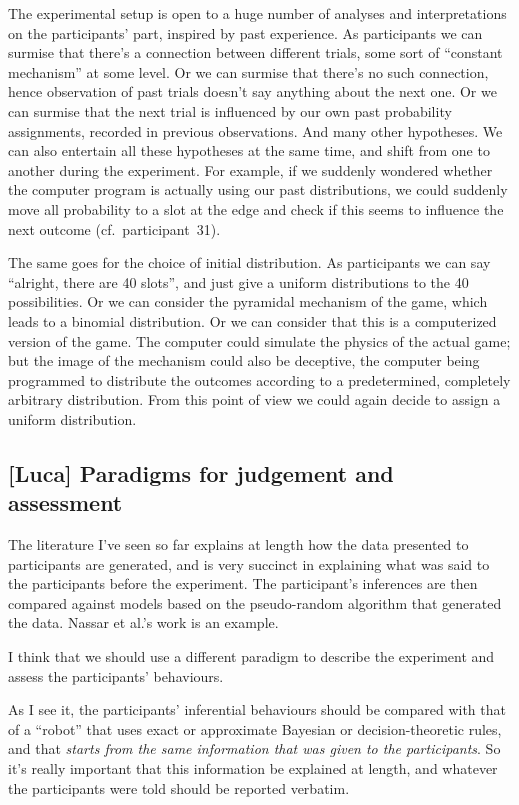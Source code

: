 \documentclass[\ifafour a4paper,12pt,\else a5paper,10pt,\fi%
onecolumn,oneside,article,%
british%
]{memoir}
\newcommand*{\etal}{{et al.}}
\theoremstyle{remark}
\theoremstyle{innote}
\newcommand*{\citey}{\parencites*}
\renewcommand*{\|}{\mathpunct{|}}
\newcommand*{\cf}{{cf.}}
\begin{document}
The experimental setup is open to a huge number of analyses and
interpretations on the participants' part, inspired by past experience. As
participants we can surmise that there's a connection between different
trials, some sort of \enquote{constant mechanism} at some level. Or we can
surmise that there's no such connection, hence observation of past trials
doesn't say anything about the next one. Or we can surmise that the next
trial is influenced by our own past probability assignments, recorded in
previous observations. And many other hypotheses. We can also entertain all
these hypotheses at the same time, and shift from one to another during the
experiment. For example, if we suddenly wondered whether the computer
program is actually using our past distributions, we could suddenly move
all probability to a slot at the edge and check if this seems to influence
the next outcome (\cf\ participant~31).

The same goes for the choice of initial distribution. As participants we
can say \enquote{alright, there are 40 slots}, and just give a uniform
distributions to the 40 possibilities. Or we can consider the pyramidal
mechanism of the game, which leads to a binomial distribution. Or we can
consider that this is a computerized version of the game. The computer
could simulate the physics of the actual game; but the image of the
mechanism could also be deceptive, the computer being programmed to
distribute the outcomes according to a predetermined, completely arbitrary
distribution. From this point of view we could again decide to assign a
uniform distribution.

\subsection{[Luca] Paradigms for judgement and assessment}

The literature I've seen so far explains at length how the data presented
to participants are generated, and is very succinct in explaining what was
said to the participants before the experiment. The participant's
inferences are then compared against models based on the pseudo-random
algorithm that generated the data. Nassar \etal's \citey{nassaretal2010}
work is an example.

I think that we should use a different paradigm to describe the experiment
and assess the participants' behaviours.

As I see it, the participants' inferential behaviours should be compared
with that of a \enquote{robot} that uses exact or approximate Bayesian or
decision-theoretic rules, and that \emph{starts from the same information
  that was given to the participants}. So it's really important that this
information be explained at length, and whatever the participants were told
should be reported verbatim.
\end{document}
